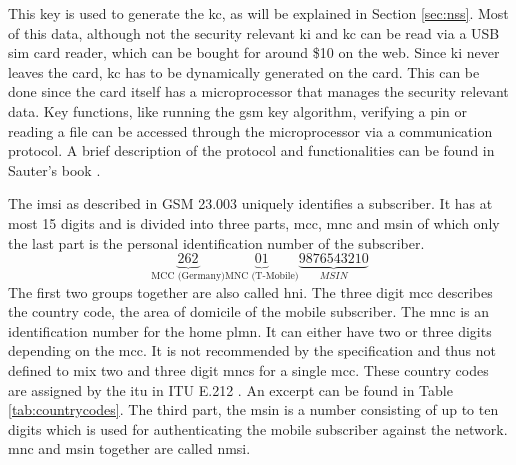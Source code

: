 This key is used to generate the \gls{kc}, as will be explained in Section \ref{sec:nss}.
Most of this data, although not the security relevant \gls{ki} and \gls{kc} can be read via a USB \gls{sim} card reader, which can be bought for around \$10 on the web.
Since \gls{ki} never leaves the card, \gls{kc} has to be dynamically generated on the card.
This can be done since the card itself has a microprocessor that manages the security relevant data.
Key functions, like running the \gls{gsm} key algorithm, verifying a \gls{pin} or reading a file can be accessed through the microprocessor via a communication protocol.
A brief description of the protocol and functionalities can be found in Sauter's book \cite{kommsys2006}.

The \gls{imsi} as described in GSM 23.003 \cite{GSM23003} uniquely identifies a subscriber.
It has at most 15 digits and is divided into three parts, \gls{mcc}, \gls{mnc} and \gls{msin} of which only the last part is the personal identification number of the subscriber.
\[\underbrace{262}_{\text{MCC (Germany)}} \underbrace{01}_{\text{MNC (T-Mobile)}} \underbrace{9876543210}_{MSIN}\]
The first two groups together are also called \gls{hni}.
The three digit \gls{mcc} describes the country code, the area of domicile of the mobile subscriber.
The \gls{mnc} is an identification number for the home \gls{plmn}.
It can either have two or three digits depending on the \gls{mcc}.
It is not recommended by the specification and thus not defined to mix two and three digit \gls{mnc}s for a single \gls{mcc}.
These country codes are assigned by the \gls{itu} in ITU E.212 \cite{ITU212}.
An excerpt can be found in Table \ref{tab:countrycodes}.
The third part, the \gls{msin} is a number consisting of up to ten digits which is used for authenticating the mobile subscriber against the network.
\gls{mnc} and \gls{msin} together are called \gls{nmsi}.
